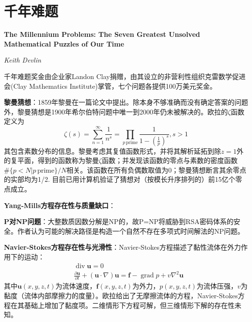 \chapter{千年难题}
\Large\textbf{The Millennium Problems: The Seven Greatest Unsolved Mathematical Puzzles of Our Time}
\par \emph{Keith Devlin} \normalsize

\par 千年难题奖金由企业家Landon Clay捐赠，由其设立的非营利性组织克雷数学促进会(Clay Mathematics Institute)掌管，七个问题各提供100万美元奖金。

\par \textbf{黎曼猜想}：1859年黎曼在一篇论文中提出。除本身不够准确而没有确定答案的问题外，黎曼猜想是1900年希尔伯特问题中唯一到2000年仍未被解决的。欧拉的$\zeta$函数定义为
\begin{equation}
    \zeta(s)=\sum_{n=1}^\infty \frac{1}{n^s}=\prod_{p\, \text{prime}}\frac{1}{1-(\frac{1}{p})^s}, s>1
\end{equation}
其包含素数分布的信息。黎曼考虑其复值函数形式，并将其解析延拓到除$z=1$外的复平面，得到的函数称为黎曼$\zeta$函数；并发现该函数的零点与素数的密度函数$\#\{p<N\vert p\, \text{prime}\}/N$相关。该函数在所有负偶数取值为0；黎曼猜想断言其余零点的实部均为1/2. 目前已用计算机验证了猜想对（按模长升序排列的）前15亿个零点成立。

\par \textbf{Yang-Mills方程存在性与质量缺口}：

\par \textbf{P对NP问题}：大整数质因数分解是NP的，故P=NP将威胁到RSA密码体系的安全。作者认为可能的解决路径是构造一个自然不存在多项式时间解法的NP问题。

\par \textbf{Navier-Stokes方程存在性与光滑性}：Navier-Stokes方程描述了黏性流体在外力作用下的运动：
\begin{align}
    &\operatorname{div} \mathbf{u} =0\\
    &\frac{\partial \mathbf{u}}{\partial t}+(\mathbf{u}\cdot  \nabla)\mathbf{u}=\mathbf{f}-\operatorname{grad} p + v \nabla^2 \mathbf{u}
\end{align}
其中$\mathbf{u}(x,y,z,t)$为流体速度，$\mathbf{f}(x,y,z,t)$为外力，$p(x,y,z,t)$为流体压强，$v$为黏度（流体内部摩擦力的度量）。欧拉给出了无摩擦流体的方程，Navier-Stokes方程在其基础上增加了黏度项。二维情形下方程可解，但三维情形下解的存在性未知。

